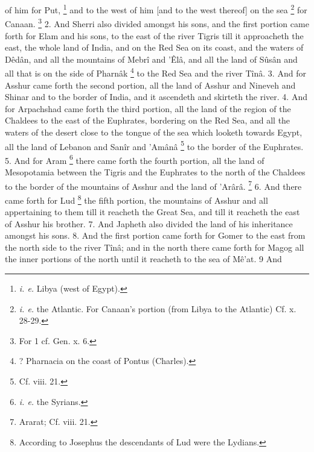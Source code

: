 of him for Put, \footnote{\emph{i. e.} Libya (west of Egypt).} and to the west of him [and to the west thereof] on the sea \footnote{\emph{i. e.} the Atlantic. For Canaan's portion (from Libya to the Atlantic) Cf. x. 28-29.} for Canaan. \footnote{For 1 cf. Gen. x. 6.} 2. And Sherri also divided amongst his sons, and the first portion came forth for Elam and his sons, to the east of the river Tigris till it approacheth the east, the whole land of India, and on the Red Sea on its coast, and the waters of Dêdân, and all the mountains of Mebrî and ’Êlâ, and all the land of Sûsân and all that is on the side of Pharnâk \footnote{? Pharnacia on the coast of Pontus (Charles).} to the Red Sea and the river Tînâ. 3. And for Asshur came forth the second portion, all the land of Asshur and Nineveh and Shinar and to the border of India, and it ascendeth and skirteth the river. 4. And for Arpachshad came forth the third portion, all the land of the region of the Chaldees to the east of the Euphrates, bordering on the Red Sea, and all the waters of the desert close to the tongue of the sea which looketh towards Egypt, all the land of Lebanon and Sanîr and ’Amânâ \footnote{Cf. viii. 21.} to the border of the Euphrates. 5. And for Aram \footnote{\emph{i. e.} the Syrians.} there came forth the fourth portion, all the land of Mesopotamia between the Tigris and the Euphrates to the north of the Chaldees to the border of the mountains of Asshur and the land of ’Arârâ. \footnote{Ararat; Cf. viii. 21.} 6. And there came forth for Lud \footnote{According to Josephus the descendants of Lud were the Lydians.} the fifth portion, the mountains of Asshur and all appertaining to them till it reacheth the Great Sea, and till it reacheth the east of Asshur his brother. 7. And Japheth also divided the land of his inheritance amongst his sons. 8. And the first portion came forth for Gomer to the east from the north side to the river Tînâ; and in the north there came forth for Magog all the inner portions of the north until it reacheth to the sea of Mê’at. 9 And

